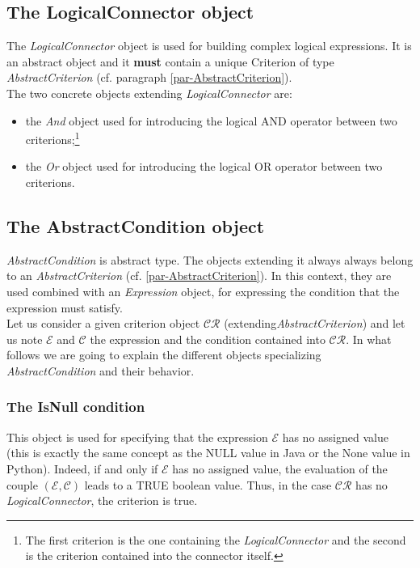 \documentclass[a4paper,11pt] {article}
\begin{document}
\subsection{The LogicalConnector object}\label{par-LogicalConnector}
The {\it LogicalConnector} object is used for building complex logical expressions. It is an abstract object and it {\bf must} contain a unique Criterion of type {\it AbstractCriterion} (cf. paragraph \ref{par-AbstractCriterion}).\\
The two concrete objects extending {\it LogicalConnector} are:
\begin{itemize}
\item the {\it And} object used for introducing the logical AND operator between two criterions;\footnote{The first criterion is the one containing the {\it LogicalConnector} and the second is the criterion contained into the connector itself.}
\item the {\it Or} object used for introducing the logical OR operator between two criterions.
\end{itemize}

\subsection{The AbstractCondition object}\label{par-ConditionType}
{\it AbstractCondition} is abstract type. The objects extending it always always belong to an  {\it  AbstractCriterion} (cf. \ref{par-AbstractCriterion}). In this context, they are used combined with an {\it Expression} object, for expressing the condition that the expression must satisfy.\\ 
Let us consider a given criterion object $\mathcal{CR}$ (extending{\it AbstractCriterion})  and let us note $\mathcal E$ and
$\mathcal C$ the expression and the condition contained into $\mathcal{CR}$.
In what follows we are going to explain the different objects specializing  {\it AbstractCondition} and their behavior.

\subsubsection{The IsNull condition}\label{par-IsNull}
This object is used for specifying that the expression $\mathcal E$ has no assigned value (this is exactly the same concept as the NULL value in Java or the None value in Python). 
Indeed, if and only if $\mathcal E$ has no assigned value, the evaluation of the couple $(\mathcal E, \mathcal C)$ leads to a TRUE boolean value. Thus, in the case $\mathcal{CR}$ has no {\it LogicalConnector}, the criterion is true.
\end{document}
